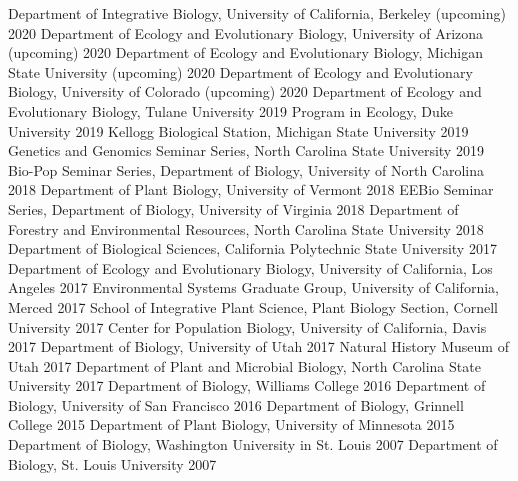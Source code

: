 \documentclass[11pt,english]{article}\usepackage[]{graphicx}\usepackage[]{color}
\begin{document}
Department of Integrative Biology, University of California, Berkeley (upcoming) \hfill{2020}
Department of Ecology and Evolutionary Biology, University of Arizona (upcoming) \hfill{2020}
Department of Ecology and Evolutionary Biology, Michigan State University (upcoming) \hfill {2020} \newline
Department of Ecology and Evolutionary Biology, University of Colorado (upcoming) \hfill {2020} \newline
Department of Ecology and Evolutionary Biology, Tulane University \hfill {2019} \newline
Program in Ecology, Duke University \hfill {2019}\newline
Kellogg Biological Station, Michigan State University \hfill {2019} \newline
Genetics and Genomics Seminar Series, North Carolina State University \hfill {2019} \newline
Bio-Pop Seminar Series, Department of Biology, University of North Carolina \hfill {2018} \newline
Department of Plant Biology, University of Vermont \hfill {2018} \newline
EEBio Seminar Series, Department of Biology, University of Virginia \hfill {2018} \newline
Department of Forestry and Environmental Resources, North Carolina State University \hfill {2018} \newline
Department of Biological Sciences, California Polytechnic State University \hfill {2017} \newline
Department of Ecology and Evolutionary Biology, University of California, Los Angeles \hfill {2017} \newline
Environmental Systems Graduate Group, University of California, Merced \hfill {2017} \newline
School of Integrative Plant Science, Plant Biology Section, Cornell University \hfill {2017} \newline
Center for Population Biology, University of California, Davis \hfill {2017} \newline
Department of Biology, University of Utah \hfill {2017} \newline
Natural History Museum of Utah \hfill {2017} \newline
Department of Plant and Microbial Biology, North Carolina State University \hfill {2017} \newline
Department of Biology, Williams College \hfill {2016} \newline
Department of Biology, University of San Francisco \hfill {2016} \newline
Department of Biology, Grinnell College \hfill {2015} \newline
Department of Plant Biology, University of Minnesota \hfill {2015} \newline
Department of Biology, Washington University in St. Louis \hfill {2007} \newline
Department of Biology, St. Louis University \hfill {2007} \newline
\vspace{-2ex}
\end{document}
